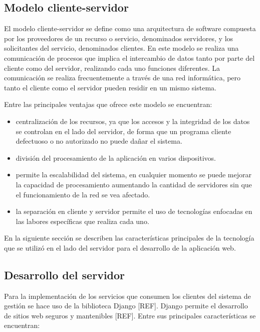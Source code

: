 \subsection{Modelo cliente-servidor}

El modelo cliente-servidor se define como una arquitectura
de software compuesta por los proveedores de un recurso o servicio, 
denominados servidores, y los solicitantes del servicio, denominados
clientes. En este modelo se realiza una comunicación de procesos
que implica el intercambio de datos tanto por parte del cliente 
como del servidor, realizando cada uno funciones diferentes. La comunicación
se realiza frecuentemente a través de una red informática, pero 
tanto el cliente como el servidor pueden residir en un mismo sistema.

Entre las principales ventajas que ofrece este modelo se encuentran:

\begin{itemize}
    \item centralización de los recursos, ya que los accesos y la integridad de los datos se controlan en el lado del servidor, de forma que un programa cliente defectuoso o no autorizado no puede dañar el sistema.
    \item división del procesamiento de la aplicación en varios dispositivos.
    \item permite la escalabilidad del sistema, en cualquier momento se puede mejorar la capacidad de procesamiento aumentando la cantidad de servidores sin que el funcionamiento de la red se vea afectado.
    \item la separación en cliente y servidor permite el uso de tecnologías enfocadas en las labores específicas que realiza cada uno. 
\end{itemize}
 

En la siguiente sección se describen las características 
principales de la tecnología 
que se utilizó en el lado del servidor para el desarrollo de la aplicación web.

\subsection{Desarrollo del servidor}
Para la implementación de los servicios que consumen los clientes del 
sistema de gestión se hace uso de la biblioteca Django [REF]. Django permite el desarrollo de 
sitios web seguros y mantenibles [REF]. Entre sus principales características
se encuentran:

